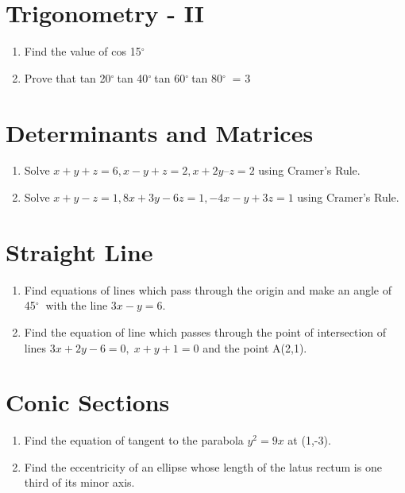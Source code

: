\documentclass[14pt]{article}
\newcommand{\degree}{$^{\circ}\ $} %
\begin{document}
\begin{multicols}{2}
\section{Trigonometry - II}
\noindent
\begin{enumerate}
\item Find the value of cos 15\degree

\item Prove that tan 20\degree tan 40\degree tan 60\degree tan 80\degree
= 3 

\end{enumerate} 

\section{ Determinants and Matrices}
\noindent
\begin{enumerate}
\item Solve $
x+y+z = 6,  x-y+z = 2,  x+2y–z = 2$ using Cramer's Rule.

\item Solve $x +y - z = 1,  8x +3y - 6z = 1, -4x - y + 3z = 1$ using Cramer's Rule.
\end{enumerate} 

\section{Straight Line}
\noindent
\begin{enumerate}
\item Find equations of lines which pass
through the origin and make an angle of 45\degree
with the line $3x - y = 6.$

\item Find the equation of line which passes
	 through the point of intersection of lines
	 $3 x + 2 y - 6 = 0 ,\; x + y + 1 = 0$ and the point A(2,1).

\end{enumerate} 


\section{Conic Sections}
\noindent
\begin{enumerate}
\item Find the equation of tangent to the parabola
$y^2 = 9x$ at (1,-3).

\item Find the eccentricity of an ellipse whose
length of the latus rectum is one third of its
minor axis.


\end{enumerate}
\end{multicols}
\end{document}

